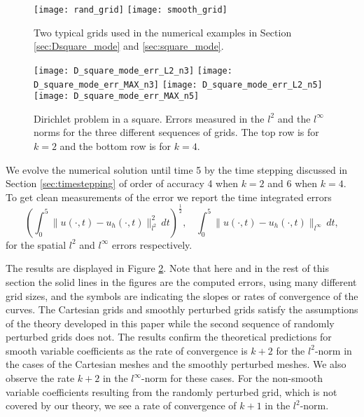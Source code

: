 \documentclass[onefignum,onetabnum]{siamart171218}
\begin{document}
\begin{figure}[htb]
\begin{center}
\texttt{[image: rand\_grid]}
\texttt{[image: smooth\_grid]}
\caption{Two typical grids used in the numerical examples in Section \ref{sec:Dsquare_mode} and \ref{sec:square_mode}. \label{fig:square_mode_grids}}
\end{center}
\end{figure}


\begin{figure}[htb]
\begin{center}
\texttt{[image: D\_square\_mode\_err\_L2\_n3]}
\texttt{[image: D\_square\_mode\_err\_MAX\_n3]}
\texttt{[image: D\_square\_mode\_err\_L2\_n5]}
\texttt{[image: D\_square\_mode\_err\_MAX\_n5]}
\caption{Dirichlet problem in a square. Errors measured in the $l^2$ and the $l^\infty$ norms for the three different sequences of grids. The top row is for $k=2$ and the bottom row is for $k=4$. \label{fig:D_square_mode_errs}}
\end{center}
\end{figure}	
	

We evolve the numerical solution until time 5 by the time stepping discussed in Section \ref{sec:timestepping} of order of accuracy 4 when $k=2$ and 6 when $k=4$. To get clean measurements of the error we report the time integrated errors 
\[
\left(\int_0^{5} \|u(\cdot,t) - u_h(\cdot,t)\|^2_{l^2} \, dt \right)^{\frac{1}{2}}, \ \ \ \ \int_0^{5} \|u(\cdot,t) - u_h(\cdot,t)\|_{l^\infty} \, dt,
\]
for the spatial $l^2$ and $l^\infty$ errors respectively. 


The results are displayed in Figure \ref{fig:D_square_mode_errs}. Note that here and in the rest of this section the solid lines in the figures are the computed errors, using many different grid sizes, and the symbols are indicating the slopes or rates of convergence of the curves. 
 The Cartesian grids and smoothly perturbed grids satisfy the assumptions of the theory developed in this paper while the second sequence of randomly perturbed grids does not.
The results confirm the theoretical predictions  for smooth variable coefficients  as the rate of convergence is $k+2$ for the $l^2$-norm in the cases of the Cartesian meshes and the smoothly perturbed meshes. 
We also observe the rate $k+2$ in the $l^\infty$-norm for these cases. For the non-smooth variable coefficients resulting from the randomly perturbed grid, which is not covered by our theory, we see a rate of convergence of $k+1$ in the $l^2$-norm. 
\end{document}
